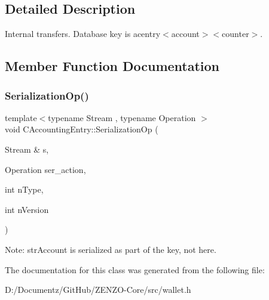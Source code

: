 \subsection{Detailed Description}
Internal transfers. Database key is acentry$<$account$>$$<$counter$>$. 

\subsection{Member Function Documentation}
\mbox{\label{class_c_accounting_entry_ab30195f9f97f8f7ceb17360c24a39676}} 
\subsubsection{\texorpdfstring{SerializationOp()}{SerializationOp()}}
{\footnotesize\ttfamily template$<$typename Stream , typename Operation $>$ \\
void C\+Accounting\+Entry\+::\+Serialization\+Op (\begin{DoxyParamCaption}\item[{Stream \&}]{s,  }\item[{Operation}]{ser\+\_\+action,  }\item[{int}]{n\+Type,  }\item[{int}]{n\+Version }\end{DoxyParamCaption})\hspace{0.3cm}{\ttfamily [inline]}}

Note\+: str\+Account is serialized as part of the key, not here. 

The documentation for this class was generated from the following file\+:\begin{DoxyCompactItemize}
\item 
D\+:/\+Documentz/\+Git\+Hub/\+Z\+E\+N\+Z\+O-\/\+Core/src/wallet.\+h\end{DoxyCompactItemize}

